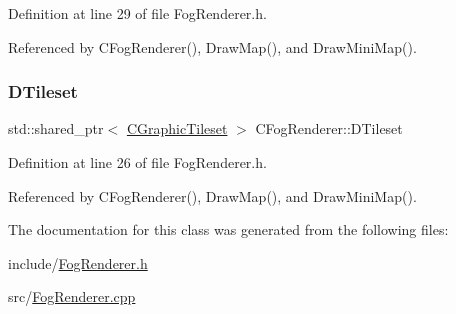 Definition at line 29 of file Fog\+Renderer.\+h.



Referenced by C\+Fog\+Renderer(), Draw\+Map(), and Draw\+Mini\+Map().

\hypertarget{classCFogRenderer_af9f3956c6e371f112ee1ce5decd7ae89}{}\label{classCFogRenderer_af9f3956c6e371f112ee1ce5decd7ae89} 
\subsubsection{\texorpdfstring{D\+Tileset}{DTileset}}
{\footnotesize\ttfamily std\+::shared\+\_\+ptr$<$ \hyperlink{classCGraphicTileset}{C\+Graphic\+Tileset} $>$ C\+Fog\+Renderer\+::\+D\+Tileset\hspace{0.3cm}{\ttfamily [protected]}}



Definition at line 26 of file Fog\+Renderer.\+h.



Referenced by C\+Fog\+Renderer(), Draw\+Map(), and Draw\+Mini\+Map().



The documentation for this class was generated from the following files\+:\begin{DoxyCompactItemize}
\item 
include/\hyperlink{FogRenderer_8h}{Fog\+Renderer.\+h}\item 
src/\hyperlink{FogRenderer_8cpp}{Fog\+Renderer.\+cpp}\end{DoxyCompactItemize}
